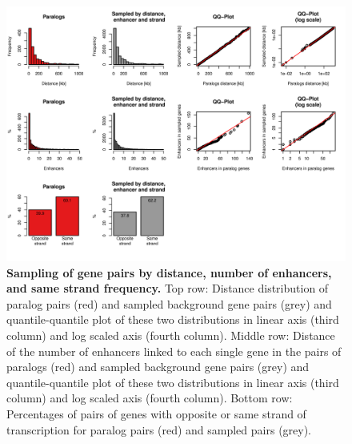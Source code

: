 \documentclass[a4paper,twoside=true,openright,parskip=full,chapterprefix=true,11pt,headings=normal,bibliography=totoc,listof=totoc,titlepage=on,captions=tableabove,draft=false]{scrreprt}
\theoremstyle{definition}
\theoremstyle{definition}
\theoremstyle{definition}
\theoremstyle{remark}
\begin{document}
\begin{figure}

{\centering \includegraphics[width=0.5\linewidth]{figures/paralog/SI/figS5} 

}

\caption{\textbf{Sampling of gene pairs by distance,
number of enhancers, and same strand frequency.} Top row: Distance
distribution of paralog pairs (red) and sampled background gene pairs
(grey) and quantile-quantile plot of these two distributions in linear
axis (third column) and log scaled axis (fourth column). Middle row:
Distance of the number of enhancers linked to each single gene in the
pairs of paralogs (red) and sampled background gene pairs (grey) and
quantile-quantile plot of these two distributions in linear axis (third
column) and log scaled axis (fourth column). Bottom row: Percentages of
pairs of genes with opposite or same strand of transcription for paralog
pairs (red) and sampled pairs (grey).}\label{fig:samplingDistEhStrand}
\end{figure}
\end{document}
